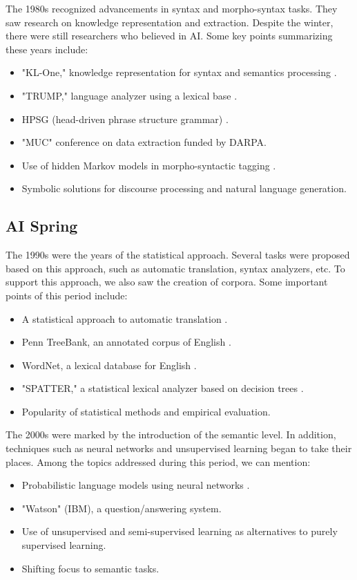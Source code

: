 \documentclass{KBook}
\begin{document}
The 1980s recognized advancements in syntax and morpho-syntax tasks. They saw research on knowledge representation and extraction. Despite the winter, there were still researchers who believed in AI. Some key points summarizing these years include:
\begin{itemize}
	\item {} "KL-One," knowledge representation for syntax and semantics processing \cite{1980-bobrow}.
	\item {} "TRUMP," language analyzer using a lexical base \cite{1986-jacobs}.
	\item {} HPSG (head-driven phrase structure grammar) \cite{1987-sag-pollard}.
	\item {} "MUC" conference on data extraction funded by DARPA.
	\item {} Use of hidden Markov models in morpho-syntactic tagging \cite{1988-church}.
	\item Symbolic solutions for discourse processing and natural language generation.
\end{itemize}

\subsection{AI Spring}

The 1990s were the years of the statistical approach. Several tasks were proposed based on this approach, such as automatic translation, syntax analyzers, etc. To support this approach, we also saw the creation of corpora. Some important points of this period include:
\begin{itemize}
	\item {} A statistical approach to automatic translation \cite{1990-brown-al}.
	\item {} Penn TreeBank, an annotated corpus of English \cite{1993-marcus-al}.
	\item {} WordNet, a lexical database for English \cite{1995-miller}.
	\item {} "SPATTER," a statistical lexical analyzer based on decision trees \cite{1996-magerman}.
	\item Popularity of statistical methods and empirical evaluation.
\end{itemize}

The 2000s were marked by the introduction of the semantic level. In addition, techniques such as neural networks and unsupervised learning began to take their places. Among the topics addressed during this period, we can mention:
\begin{itemize}
	\item {} Probabilistic language models using neural networks \cite{2003-bengio-al}.
	\item {} "Watson" (IBM), a question/answering system.
	\item Use of unsupervised and semi-supervised learning as alternatives to purely supervised learning.
	\item Shifting focus to semantic tasks.
\end{itemize}
\end{document}
